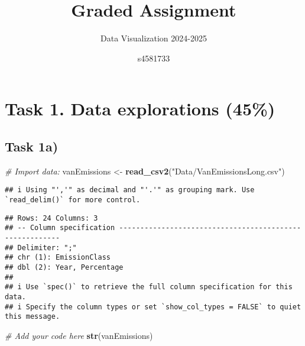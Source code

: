 \documentclass[
]{article}
\title{Graded Assignment}
\subtitle{Data Visualization 2024-2025}
\author{s4581733}
\date{}
\newenvironment{Shaded}{\begin{snugshade}}{\end{snugshade}}
\newcommand{\CommentTok}[1]{\textcolor[rgb]{0.56,0.35,0.01}{\textit{#1}}}
\newcommand{\FunctionTok}[1]{\textcolor[rgb]{0.13,0.29,0.53}{\textbf{#1}}}
\newcommand{\NormalTok}[1]{#1}
\newcommand{\OtherTok}[1]{\textcolor[rgb]{0.56,0.35,0.01}{#1}}
\newcommand{\SpecialCharTok}[1]{\textcolor[rgb]{0.81,0.36,0.00}{\textbf{#1}}}
\newcommand{\StringTok}[1]{\textcolor[rgb]{0.31,0.60,0.02}{#1}}
\begin{document}
\maketitle

\section{Task 1. Data explorations
(45\%)}\label{task-1.-data-explorations-45}

\subsection{Task 1a)}\label{task-1a}

\begin{Shaded}
\begin{Highlighting}[]
\CommentTok{\# Import data:}
\NormalTok{vanEmissions }\OtherTok{\textless{}{-}} \FunctionTok{read\_csv2}\NormalTok{(}\StringTok{"Data/VanEmissionsLong.csv"}\NormalTok{)}
\end{Highlighting}
\end{Shaded}

\begin{verbatim}
## i Using "','" as decimal and "'.'" as grouping mark. Use `read_delim()` for more control.
\end{verbatim}

\begin{verbatim}
## Rows: 24 Columns: 3
## -- Column specification --------------------------------------------------------
## Delimiter: ";"
## chr (1): EmissionClass
## dbl (2): Year, Percentage
## 
## i Use `spec()` to retrieve the full column specification for this data.
## i Specify the column types or set `show_col_types = FALSE` to quiet this message.
\end{verbatim}

\begin{Shaded}
\end{Shaded}

\begin{Shaded}
\begin{Highlighting}[]
\CommentTok{\# Add your code here}
\FunctionTok{str}\NormalTok{(vanEmissions)}
\end{Highlighting}
\end{Shaded}
\end{document}
